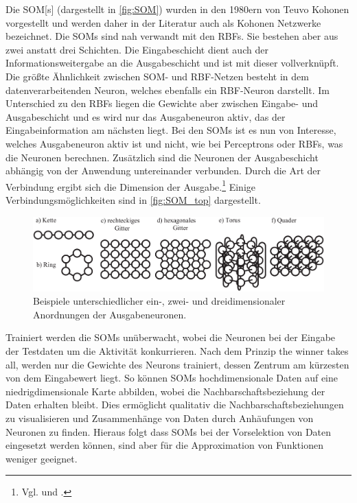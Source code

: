 Die \gls{SOM}[s] (dargestellt in \autoref{fig:SOM}) wurden in den 1980ern von Teuvo Kohonen vorgestellt und werden daher in der Literatur auch als Kohonen Netzwerke bezeichnet. Die SOMs sind nah verwandt mit den RBFs. Sie bestehen aber aus zwei anstatt drei Schichten. Die Eingabeschicht dient auch der Informationsweitergabe an die Ausgabeschicht und ist mit dieser vollverknüpft. Die größte Ähnlichkeit zwischen SOM- und RBF-Netzen besteht in dem datenverarbeitenden Neuron, welches ebenfalls ein RBF-Neuron darstellt. Im Unterschied zu den RBFs liegen die Gewichte aber zwischen Eingabe- und Ausgabeschicht und es wird nur das Ausgabeneuron aktiv, das der Eingabeinformation am nächsten liegt.
Bei den SOMs ist es nun von Interesse, welches Ausgabeneuron aktiv ist und nicht, wie bei Perceptrons oder RBFs, was die Neuronen berechnen. Zusätzlich sind die Neuronen der Ausgabeschicht abhängig von der Anwendung untereinander verbunden. Durch die Art der Verbindung ergibt sich die Dimension der Ausgabe.\footnote{Vgl. \citet[102 ff]{Kruse15} und \citet[153 ff]{dkriesel07}.} Einige Verbindungsmöglichkeiten sind in \autoref{fig:SOM_top} dargestellt.
\begin{figure}[tb]
    \centering
        \includegraphics[width=1\textwidth]{Bilder/Netzwerke/som_top.png}
    \caption[Unterschiedliche Anordnungen der Ausgabeneuronen von SOMs]{Beispiele unterschiedlicher ein-, zwei- und dreidimensionaler Anordnungen der Ausgabeneuronen.\protect\footnotemark{}}
    \label{fig:SOM_top}
\end{figure}
\addtocounter{footnote}{-1}     %
\addtocounter{Hfootnote}{-1}    %
\wrapfigfoot{}

Trainiert werden die SOMs unüberwacht, wobei die Neuronen bei der Eingabe der Testdaten um die Aktivität konkurrieren. Nach dem Prinzip \glqq the winner takes all\grqq, werden nur die Gewichte des Neurons trainiert, dessen Zentrum am kürzesten von dem Eingabewert liegt.
So können SOMs hochdimensionale Daten auf eine niedrigdimensionale Karte abbilden, wobei die Nachbarschaftsbeziehung der Daten erhalten bleibt. Dies ermöglicht qualitativ die Nachbarschaftsbeziehungen zu visualisieren und Zusammenhänge von Daten durch Anhäufungen von Neuronen zu finden. Hieraus folgt dass SOMs bei der Vorselektion von Daten eingesetzt werden können, sind aber für die Approximation von Funktionen weniger geeignet.

